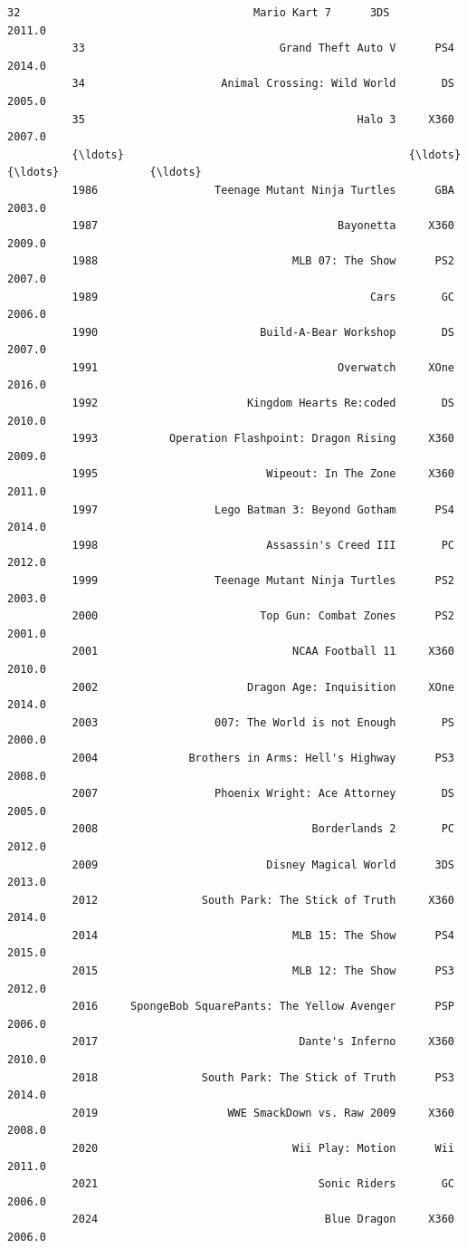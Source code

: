 \documentclass[11pt]{article}
\begin{document}
\begin{Verbatim}[commandchars=\\\{\}]
          32                                    Mario Kart 7      3DS           2011.0   
          33                              Grand Theft Auto V      PS4           2014.0   
          34                     Animal Crossing: Wild World       DS           2005.0   
          35                                          Halo 3     X360           2007.0   
          {\ldots}                                            {\ldots}      {\ldots}              {\ldots}   
          1986                  Teenage Mutant Ninja Turtles      GBA           2003.0   
          1987                                     Bayonetta     X360           2009.0   
          1988                              MLB 07: The Show      PS2           2007.0   
          1989                                          Cars       GC           2006.0   
          1990                         Build-A-Bear Workshop       DS           2007.0   
          1991                                     Overwatch     XOne           2016.0   
          1992                       Kingdom Hearts Re:coded       DS           2010.0   
          1993           Operation Flashpoint: Dragon Rising     X360           2009.0   
          1995                          Wipeout: In The Zone     X360           2011.0   
          1997                  Lego Batman 3: Beyond Gotham      PS4           2014.0   
          1998                          Assassin's Creed III       PC           2012.0   
          1999                  Teenage Mutant Ninja Turtles      PS2           2003.0   
          2000                         Top Gun: Combat Zones      PS2           2001.0   
          2001                              NCAA Football 11     X360           2010.0   
          2002                       Dragon Age: Inquisition     XOne           2014.0   
          2003                  007: The World is not Enough       PS           2000.0   
          2004              Brothers in Arms: Hell's Highway      PS3           2008.0   
          2007                  Phoenix Wright: Ace Attorney       DS           2005.0   
          2008                                 Borderlands 2       PC           2012.0   
          2009                          Disney Magical World      3DS           2013.0   
          2012                South Park: The Stick of Truth     X360           2014.0   
          2014                              MLB 15: The Show      PS4           2015.0   
          2015                              MLB 12: The Show      PS3           2012.0   
          2016     SpongeBob SquarePants: The Yellow Avenger      PSP           2006.0   
          2017                               Dante's Inferno     X360           2010.0   
          2018                South Park: The Stick of Truth      PS3           2014.0   
          2019                    WWE SmackDown vs. Raw 2009     X360           2008.0   
          2020                              Wii Play: Motion      Wii           2011.0   
          2021                                  Sonic Riders       GC           2006.0   
          2024                                   Blue Dragon     X360           2006.0   
          

\end{Verbatim}
\end{document}
